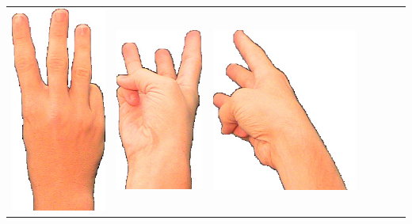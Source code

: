 \documentclass{article}
\begin{document}
\begin{center}
\begin{tabular}{r*{6}{c}}
\includegraphics[scale=0.1]{images/06-01-3.jpg}&
\includegraphics[scale=0.1]{images/06-01-4.jpg}&
\includegraphics[scale=0.1]{images/06-01-5.jpg}&

\end{tabular}
\end{center}
\end{document}
